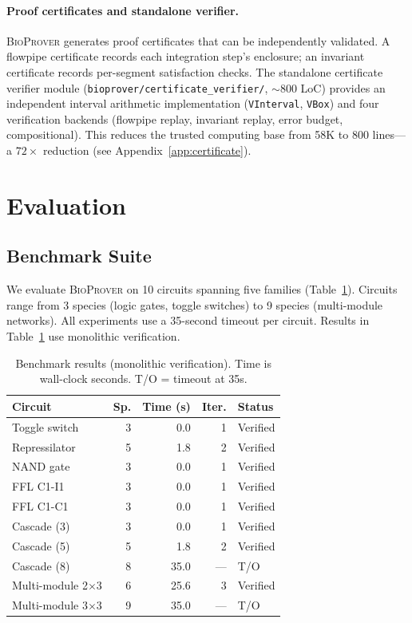 \documentclass[11pt]{article}
\newcommand{\bioprover}{\textsc{BioProver}}
\begin{document}
\paragraph{Proof certificates and standalone verifier.}
\bioprover{} generates proof certificates that can be independently
validated. A flowpipe certificate records each integration step's
enclosure; an invariant certificate records per-segment satisfaction
checks. The standalone certificate verifier module
(\texttt{bioprover/certificate\_verifier/}, $\sim$800 LoC) provides
an independent interval arithmetic implementation (\texttt{VInterval},
\texttt{VBox}) and four verification backends (flowpipe replay,
invariant replay, error budget, compositional). This reduces the
trusted computing base from 58K to 800 lines---a $72\times$ reduction
(see Appendix~\ref{app:certificate}).

\section{Evaluation}
\label{sec:evaluation}

\subsection{Benchmark Suite}

We evaluate \bioprover{} on 10 circuits spanning five families
(Table~\ref{tab:benchmarks}). Circuits range from 3 species (logic
gates, toggle switches) to 9 species (multi-module networks).
All experiments use a 35-second timeout per circuit. Results in
Table~\ref{tab:benchmarks} use monolithic verification.

\begin{table}[t]
\centering
\caption{Benchmark results (monolithic verification). Time is wall-clock seconds.
  T/O = timeout at 35s.}
\label{tab:benchmarks}
\small
\begin{tabular}{lrrrl}
\toprule
\textbf{Circuit} & \textbf{Sp.} & \textbf{Time (s)} &
  \textbf{Iter.} & \textbf{Status} \\
\midrule
Toggle switch        &  3 &  0.0 &  1 & Verified \\
Repressilator        &  5 &  1.8 &  2 & Verified \\
NAND gate            &  3 &  0.0 &  1 & Verified \\
FFL C1-I1            &  3 &  0.0 &  1 & Verified \\
FFL C1-C1            &  3 &  0.0 &  1 & Verified \\
Cascade (3)          &  3 &  0.0 &  1 & Verified \\
Cascade (5)          &  5 &  1.8 &  2 & Verified \\
Cascade (8)          &  8 & 35.0 & --- & T/O \\
Multi-module 2$\times$3 &  6 & 25.6 &  3 & Verified \\
Multi-module 3$\times$3 &  9 & 35.0 & --- & T/O \\
\bottomrule
\end{tabular}
\end{table}
\end{document}
